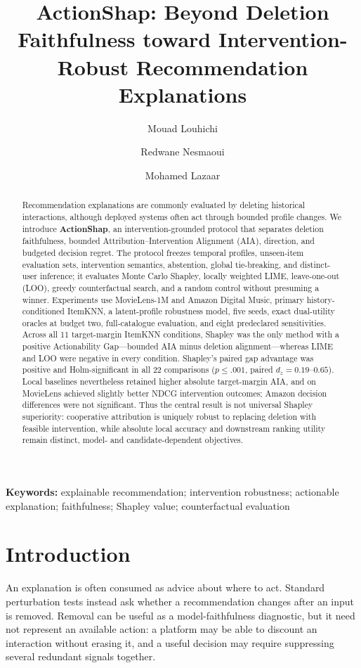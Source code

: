 \documentclass[11pt]{article}
\title{ActionShap: Beyond Deletion Faithfulness toward Intervention-Robust Recommendation Explanations}
\author{Mouad Louhichi \and Redwane Nesmaoui \and Mohamed Lazaar}
\date{}
\begin{document}
\maketitle

\begin{abstract}
Recommendation explanations are commonly evaluated by deleting historical interactions, although deployed systems often act through bounded profile changes. We introduce \textbf{ActionShap}, an intervention-grounded protocol that separates deletion faithfulness, bounded Attribution--Intervention Alignment (AIA), direction, and budgeted decision regret. The protocol freezes temporal profiles, unseen-item evaluation sets, intervention semantics, abstention, global tie-breaking, and distinct-user inference; it evaluates Monte Carlo Shapley, locally weighted LIME, leave-one-out (LOO), greedy counterfactual search, and a random control without presuming a winner. Experiments use MovieLens-1M and Amazon Digital Music, primary history-conditioned ItemKNN, a latent-profile robustness model, five seeds, exact dual-utility oracles at budget two, full-catalogue evaluation, and eight predeclared sensitivities. Across all 11 target-margin ItemKNN conditions, Shapley was the only method with a positive Actionability Gap---bounded AIA minus deletion alignment---whereas LIME and LOO were negative in every condition. Shapley's paired gap advantage was positive and Holm-significant in all 22 comparisons ($p\leq .001$, paired $d_z=0.19$--$0.65$). Local baselines nevertheless retained higher absolute target-margin AIA, and on MovieLens achieved slightly better NDCG intervention outcomes; Amazon decision differences were not significant. Thus the central result is not universal Shapley superiority: cooperative attribution is uniquely robust to replacing deletion with feasible intervention, while absolute local accuracy and downstream ranking utility remain distinct, model- and candidate-dependent objectives.
\end{abstract}

\textbf{Keywords:} explainable recommendation; intervention robustness; actionable explanation; faithfulness; Shapley value; counterfactual evaluation

\section{Introduction}
An explanation is often consumed as advice about where to act. Standard perturbation tests instead ask whether a recommendation changes after an input is removed. Removal can be useful as a model-faithfulness diagnostic, but it need not represent an available action: a platform may be able to discount an interaction without erasing it, and a useful decision may require suppressing several redundant signals together.
\end{document}
